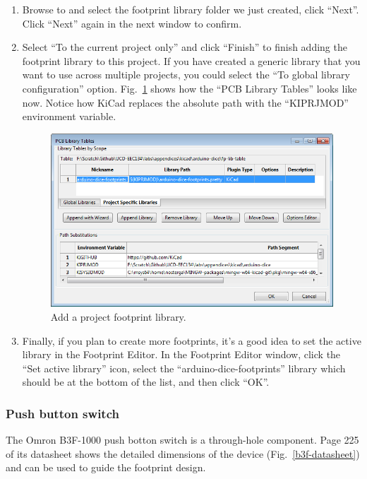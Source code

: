 \documentclass[12pt,letterpaper]{scrartcl}
\begin{document}
\begin{enumerate}
\begin{enumerate}
			\item Browse to and select the footprint library folder we just created, click ``Next''. Click ``Next'' again in the next window to confirm. 
			
			\item Select ``To the current project only'' and click ``Finish'' to finish adding the footprint library to this project. If you have created a generic library that you want to use across multiple projects, you could select the ``To global library configuration'' option. Fig.~\ref{fig:add-project-footprint-lib} shows how the ``PCB Library Tables'' looks like now. Notice how KiCad replaces the absolute path with the ``KIPRJMOD'' environment variable. 

					\begin{figure}[hp]
						\centering
						\includegraphics[width=5in]{add-project-footprint-lib}
						\caption{Add a project footprint library.}
						\label{fig:add-project-footprint-lib}
					\end{figure}
					
			\item Finally, if you plan to create more footprints, it's a good idea to set the active library in the Footprint Editor. In the Footprint Editor window, click the ``Set active library'' icon, select the ``arduino-dice-footprints'' library which should be at the bottom of the list, and then click ``OK''.  
		\end{enumerate}
	
\end{enumerate}

\subsubsection{Push button switch}
\label{sec:sw_footprint}
The Omron B3F-1000 push botton switch is a through-hole component. Page 225 of its datasheet shows the detailed dimensions of the device (Fig.~\ref{b3f-datasheet}) and can be used to guide the footprint design.  
\end{document}
